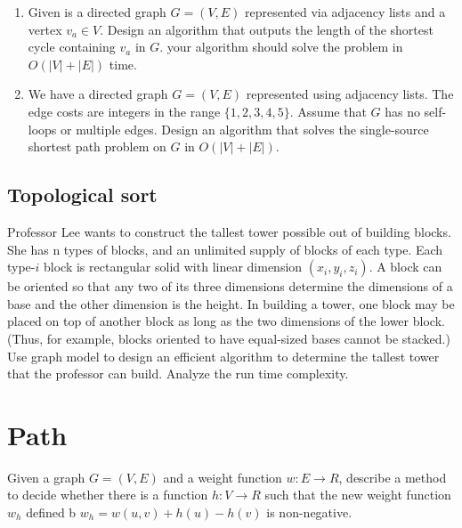 \begin{refsection}
\begin{Exercise}
\begin{enumerate}
\item Given is a directed graph $G = (V, E)$ represented via adjacency lists and a vertex $v_a \in V$. Design an algorithm that outputs the length of the shortest cycle containing $v_a$ in $G$. your algorithm should solve the problem in $O(|V| + |E|)$ time.
\item We have a directed graph $G = (V, E)$ represented using adjacency lists. The edge costs are integers in the range $\{1, 2, 3, 4, 5\}$. Assume that $G$ has no self-loops or multiple edges. Design an algorithm that solves the single-source shortest path problem on $G$ in $O(|V|+|E|)$.
\end{enumerate}
\end{Exercise}
\begin{Answer}
\end{Answer}

\subsection{Topological sort}
\begin{Exercise}
Professor Lee wants to construct the tallest tower possible out of building blocks. She has n types of blocks, and an unlimited supply of blocks of each type. Each type-$i$ block is rectangular solid with linear dimension $(x_i, y_i, z_i)$. A block can be oriented so that any two of its three dimensions determine the dimensions of a base and the other dimension is the height. In building a tower, one block may be placed on top of another block as long as the two dimensions of the lower block. (Thus, for example, blocks oriented to have equal-sized bases cannot be stacked.) Use graph model to design an efficient algorithm to determine the tallest tower that the professor can build. Analyze the run time complexity. 
\end{Exercise}
\begin{Answer}
\end{Answer}

\section{Path}
\begin{Exercise}
Given a graph $G = (V, E)$ and a weight function $w: E \rightarrow R$, describe a method to decide whether there is a function $h: V \rightarrow R$ such that the new weight function $w_h$ defined b $w_h = w(u, v) + h(u) - h(v)$ is non-negative. 
\end{Exercise}
\begin{Answer}
\end{Answer}


\end{refsection}

